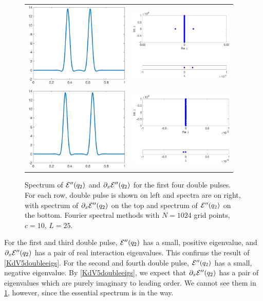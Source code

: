 \documentclass[thesis.tex]{subfiles}
\begin{document}
\begin{figure}[H]
\begin{center}
\begin{tabular}{cc}
\includegraphics[width=5cm]{images/kdv5numerics/double3} &
\includegraphics[width=5cm]{images/kdv5numerics/double3spec} \\
\includegraphics[width=5cm]{images/kdv5numerics/double4} &
\includegraphics[width=5cm]{images/kdv5numerics/double4spec} \\
\end{tabular}
\caption{Spectrum of $\mathcal{E}''(q_2)$ and $\partial_x \mathcal{E}
''(q_2)$ for the first four double pulses. For each row, double pulse is shown on left and spectra are on right, with spectrum of $\partial_x \mathcal{E}''(q_2)$ on the top and spectrum of $\mathcal{E}''(q_2)$ on the bottom. Fourier spectral methods with $N = 1024$ grid points, $c = 10$, $L = 25$.}
\label{fig:KdV5doublespec}
\end{center}
\end{figure}

For the first and third double pulse, $\mathcal{E}''(q_2)$ has a small, positive eigenvalue, and $\partial_x \mathcal{E}''(q_2)$ has a pair of real interaction eigenvalues. This confirms the result of \cref{KdV5doubleeigs}. For the second and fourth double pulse, $\mathcal{E}''(q_2)$ has a small, negative eigenvalue. By \cref{KdV5doubleeigs}, we expect that $\partial_x \mathcal{E}''(q_2)$ has a pair of eigenvalues which are purely imaginary to leading order. We cannot see them in \cref{fig:KdV5doublespec}, however, since the essential spectrum is in the way.
\end{document}
